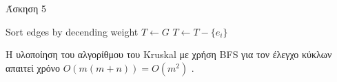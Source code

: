 \documentclass[a4paper,11pt]{article}
\begin{document}
\begin{enumerate}
\begin{algorithm}[H]
\caption{Άσκηση 5}
\begin{algorithmic}[1]
\State Sort edges by decending weight
\State $T \gets G$
	\State $T \gets T - \{e_i\}$
    \EndIf
\EndFor
\EndProcedure
\end{algorithmic}
\end{algorithm}

Η υλοποίηση του αλγορίθμου του Kruskal με χρήση BFS για τον έλεγχο
κύκλων απαιτεί χρόνο $O(m(m+n)) = O(m^2)$ .

\end{enumerate}

\end{document}
